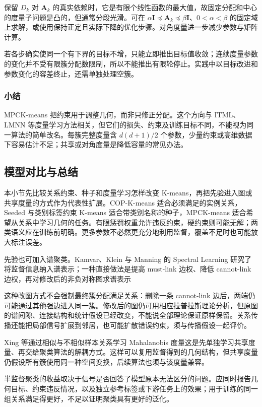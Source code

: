 保留 $D_k$ 对 $\bm{A}_k$ 的真实依赖时，它是有限个线性函数的最大值，故固定分配和中心的度量子问题是凸的，但通常分段光滑。可在 $\alpha\bm{I}\preceq\bm{A}_k\preceq\beta\bm{I}$、$0<\alpha<\beta$ 的固定域上求解，或使用保持正定且实际下降的优化步骤。对角度量进一步减少参数与矩阵计算。

若各步确实使同一个有下界的目标不增，只能立即推出目标值收敛；连续度量参数的变化并不受有限簇分配数限制，所以不能推出有限轮停止。实践中以目标改进和参数变化的容差终止，还需单独处理空簇。

\subsubsection{小结}

MPCK-means 把约束用于调整几何，而非只修正分配。这个方向与 ITML、LMNN 等度量学习方法相关，但它们的损失、约束及训练目标不同，不能视为同一算法的简单改名。每簇完整度量含 $d(d+1)/2$ 个参数，少量约束或高维数据下容易估计不足；共享或对角度量是降低容量的常见办法。

\subsection{模型对比与总结}

本小节先比较关系约束、种子和度量学习怎样改变 K-means，再把先验进入图或共享度量的方式作为代表性扩展。COP-K-means 适合必须满足的实例关系，Seeded 与类别标签约束 K-means 适合带类别名称的种子，MPCK-means 适合希望从关系中学习几何的任务。有限惩罚权重允许违反约束，硬约束则可能无解；两类语义应在训练前明确。更多参数不必然更充分地利用监督，覆盖不足时也可能放大标注误差。

先验也可加入谱聚类。Kamvar、Klein 与 Manning 的 Spectral Learning 研究了将监督信息纳入谱表示；一种直接做法是提高 must-link 边权、降低 cannot-link 边权，再对修改后的非负对称图求谱表示

这种改图方式不会强制最终簇分配满足关系：删除一条 cannot-link 边后，两端仍可能通过其他强边进入同一簇。修改后的图仍可用相应拉普拉斯理论分析，但原图的谱间隙、连接结构和统计假设已经改变，不能说全部理论保证原样保留。关系传播还能把局部信号扩展到邻居，也可能扩散错误约束，须与传播假设一起评价。

Xing 等通过相似与不相似样本关系学习 Mahalanobis 度量这是先单独学习共享度量、再交给聚类算法的解耦方式。这样可以复用监督得到的几何结构，但共享度量仍假设所有簇使用同一种空间变换，后续算法也须与该度量兼容。

半监督聚类的收益取决于信号是否回答了模型原本无法区分的问题。应同时报告几何目标、约束违反情况，以及独立参考标签或下游任务上的效果；用于训练的同一组关系满足得更好，不足以证明聚类具有更好的泛化。

